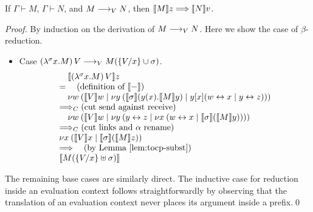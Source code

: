 \documentclass[orivec,envcountsame]{llncs}
\begin{document}

\begin{theorem}
If $\Gamma \vdash M$, $\Gamma \vdash N$, and $M \teval N$, then $\tocp{M}z
\bigrto \tocp{N}v$.
\end{theorem}
%
\begin{proof}
By induction on the derivation of $M \teval N$. Here we show the case of $\beta$-reduction.
\begin{itemize}
\item Case $(\lambda^\sigma x.M)\,V \teval M(\{\bind x V\} \cup \sigma)$.
\[
\bl
\quad \tocp{(\lambda^\sigma x.M)\,V}z \\
= \quad (\text{definition of }\tocp{-}) \\
\quad \cut{w}{}{\tocp{V}w}{\cut{y}{}{\tocp{\sigma}(y(x).\tocp{M}y)}{y[x](\link{w}{x} \mid \link{y}{z})}} \\
\bigcrto (\text{cut send against receive}) \\
\quad \cut{w}{}{\tocp{V}w}{\cut{y}{}{\link{y}{z}}{\cut{x}{}{\link{w}{x}}{\tocp{\sigma}(\tocp{M}y)}}} \\
\bigcrto (\text{cut links and $\alpha$ rename}) \\
\cut{x}{}{\tocp{V}x}{\tocp{\sigma}(\tocp{M}z)} \\
\bigrto \quad (\text{by Lemma~\ref{lem:tocp-subst}}) \\
\tocp{M(\{\bind x V\} \uplus \sigma)}
\el
\]
\end{itemize}
The remaining base cases are similarly direct. The inductive case for reduction inside an evaluation
context follows straightforwardly by observing that the translation of an evaluation context never
places its argument inside a prefix.\qed
\end{proof}
\end{document}
